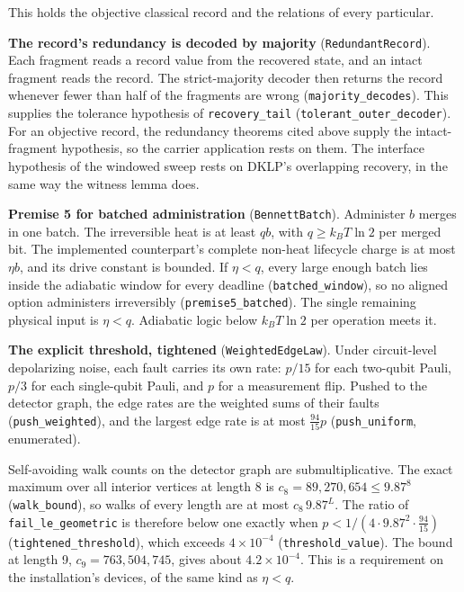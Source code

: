 \documentclass[
]{article}
\begin{document}
This holds the objective classical record and the relations of every
particular.

\textbf{The record's redundancy is decoded by majority}
(\texttt{RedundantRecord}). Each fragment reads a record value from the
recovered state, and an intact fragment reads the record. The
strict-majority decoder then returns the record whenever fewer than half
of the fragments are wrong (\texttt{majority\_decodes}). This supplies
the tolerance hypothesis of \texttt{recovery\_tail}
(\texttt{t\allowbreak{}o\allowbreak{}l\allowbreak{}e\allowbreak{}r\allowbreak{}a\allowbreak{}n\allowbreak{}t\allowbreak{}\_\allowbreak{}o\allowbreak{}u\allowbreak{}t\allowbreak{}e\allowbreak{}r\allowbreak{}\_\allowbreak{}d\allowbreak{}e\allowbreak{}c\allowbreak{}o\allowbreak{}d\allowbreak{}e\allowbreak{}r}).
For an objective record, the redundancy theorems cited above supply the
intact-fragment hypothesis, so the carrier application rests on them.
The interface hypothesis of the windowed sweep rests on DKLP's
overlapping recovery, in the same way the witness lemma does.

\textbf{Premise 5 for batched administration} (\texttt{BennettBatch}).
Administer \(b\) merges in one batch. The irreversible heat is at least
\(qb\), with \(q\ge k_BT\ln2\) per merged bit. The implemented
counterpart's complete non-heat lifecycle charge is at most \(\eta b\),
and its drive constant is bounded. If \(\eta<q\), every large enough
batch lies inside the adiabatic window for every deadline
(\texttt{batched\_window}), so no aligned option administers
irreversibly (\texttt{premise5\_batched}). The single remaining physical
input is \(\eta<q\). Adiabatic logic below \(k_BT\ln2\) per operation
meets it.

\textbf{The explicit threshold, tightened} (\texttt{WeightedEdgeLaw}).
Under circuit-level depolarizing noise, each fault carries its own rate:
\(p/15\) for each two-qubit Pauli, \(p/3\) for each single-qubit Pauli,
and \(p\) for a measurement flip. Pushed to the detector graph, the edge
rates are the weighted sums of their faults (\texttt{push\_weighted}),
and the largest edge rate is at most \(\tfrac{94}{15}p\)
(\texttt{push\_uniform}, enumerated).

Self-avoiding walk counts on the detector graph are submultiplicative.
The exact maximum over all interior vertices at length 8 is
\(c_8=89{,}270{,}654\le9.87^8\) (\texttt{walk\_bound}), so walks of
every length are at most \(c_8\,9.87^L\). The ratio of
\texttt{f\allowbreak{}a\allowbreak{}i\allowbreak{}l\allowbreak{}\_\allowbreak{}l\allowbreak{}e\allowbreak{}\_\allowbreak{}g\allowbreak{}e\allowbreak{}o\allowbreak{}m\allowbreak{}e\allowbreak{}t\allowbreak{}r\allowbreak{}i\allowbreak{}c}
is therefore below one exactly when
\(p<1/(4\cdot9.87^2\cdot\tfrac{94}{15})\)
(\texttt{t\allowbreak{}i\allowbreak{}g\allowbreak{}h\allowbreak{}t\allowbreak{}e\allowbreak{}n\allowbreak{}e\allowbreak{}d\allowbreak{}\_\allowbreak{}t\allowbreak{}h\allowbreak{}r\allowbreak{}e\allowbreak{}s\allowbreak{}h\allowbreak{}o\allowbreak{}l\allowbreak{}d}),
which exceeds \(4\times10^{-4}\) (\texttt{threshold\_value}). The bound
at length 9, \(c_9=763{,}504{,}745\), gives about \(4.2\times10^{-4}\).
This is a requirement on the installation's devices, of the same kind as
\(\eta<q\).
\end{document}
